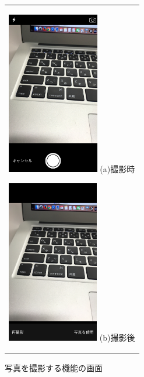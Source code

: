 \begin{figure}[htbp]
  \begin{center}
    \begin{tabular}{c}

      \begin{minipage}{0.33\hsize}
        \begin{center}
\includegraphics[width=4cm, bb=0 0 304 570]{kiko_takephoto1.PNG}
          \hspace{1cm} %
          {\footnotesize (a)撮影時}
        \end{center}
      \end{minipage}

      \begin{minipage}{0.33\hsize}
        \begin{center}
\includegraphics[width=4cm, bb=0 0 304 570]{kiko_takephoto2.PNG}
          \hspace{1cm} %
          {\footnotesize (b)撮影後}
        \end{center}
      \end{minipage}
      
    \end{tabular}
    \caption{写真を撮影する機能の画面}
    \label{fig:lena}
  \end{center}
\end{figure}　　　　　　　　　　

